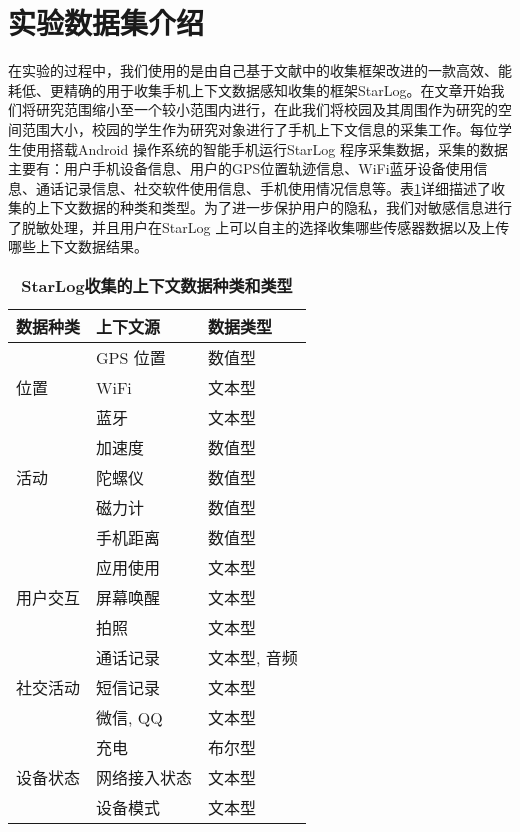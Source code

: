 \section{实验数据集介绍}
\label{sec:section5-1}
在实验的过程中，我们使用的是由自己基于文献\cite{rawassizadeh2013ubiqlog}中的收集框架改进的一款高效、能耗低、更精确的用于收集手机上下文数据感知收集的框架StarLog。在文章开始我们将研究范围缩小至一个较小范围内进行，在此我们将校园及其周围作为研究的空间范围大小，校园的学生作为研究对象进行了手机上下文信息的采集工作。每位学生使用搭载Android 操作系统的智能手机运行StarLog 程序采集数据，采集的数据主要有：用户手机设备信息、用户的GPS位置轨迹信息、WiFi蓝牙设备使用信息、通话记录信息、社交软件使用信息、手机使用情况信息等。表\ref{tablesource}详细描述了收集的上下文数据的种类和类型。为了进一步保护用户的隐私，我们对敏感信息进行了脱敏处理，并且用户在StarLog 上可以自主的选择收集哪些传感器数据以及上传哪些上下文数据结果。
\begin{center}
\begin{table}[H]
	
	\renewcommand{\arraystretch}{1.3}
	\caption{ \textbf{\small{StarLog收集的上下文数据种类和类型}}}
	\vspace{0.01cm}
	\label{tablesource}
	\centering
	\begin{tabular}{p{5cm} p{5cm} p{5cm}}
		\toprule[2pt]
		\textbf{数据种类} & \textbf{上下文源} & \textbf{数据类型} \\
		\hline
		& GPS 位置 & 数值型\\
		\cline{2-3}
		位置 & WiFi & 文本型\\
		\cline{2-3}
		& 蓝牙 & 文本型 \\
		\hline
		& 加速度 & 数值型\\
		\cline{2-3}
		活动 & 陀螺仪 & 数值型\\
		\cline{2-3}
		& 磁力计 & 数值型 \\
		\cline{2-3}
		& 手机距离 & 数值型 \\
		\hline
		& 应用使用 & 文本型\\
		\cline{2-3}
		用户交互 & 屏幕唤醒 & 文本型\\
		\cline{2-3}
		& 拍照 & 文本型 \\
		\hline
		& 通话记录 & 文本型, 音频\\
		\cline{2-3}
		社交活动 & 短信记录 & 文本型\\
		\cline{2-3}
		& 微信, QQ & 文本型 \\
		\hline
		& 充电 & 布尔型\\
		\cline{2-3}
		设备状态 & 网络接入状态 & 文本型\\
		\cline{2-3}
		& 设备模式 & 文本型 \\
		\bottomrule[2pt]
	\end{tabular}
\end{table}
\end{center}

